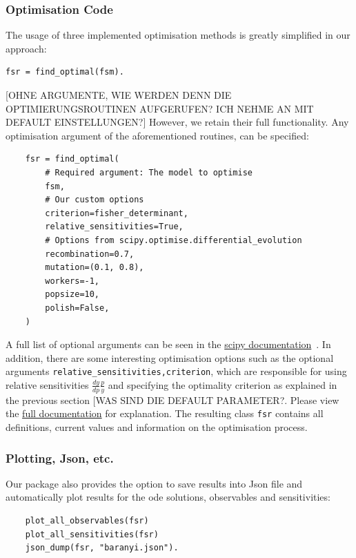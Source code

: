 \documentclass[10pt,A4paper]{article}
\begin{document}
\subsubsection*{Optimisation Code}
The usage of three implemented optimisation methods is greatly simplified in our approach: 
\begin{verbatim}
fsr = find_optimal(fsm).
\end{verbatim}
[OHNE ARGUMENTE, WIE WERDEN DENN DIE OPTIMIERUNGSROUTINEN AUFGERUFEN? ICH NEHME AN MIT DEFAULT EINSTELLUNGEN?]
However, we retain their full functionality. Any optimisation argument of the aforementioned routines, can be specified: 
\begin{verbatim}
    fsr = find_optimal(
        # Required argument: The model to optimise
        fsm,
        # Our custom options
        criterion=fisher_determinant,
        relative_sensitivities=True,
        # Options from scipy.optimise.differential_evolution
        recombination=0.7,
        mutation=(0.1, 0.8),
        workers=-1,
        popsize=10,
        polish=False,
    )
\end{verbatim}
A full list of optional arguments can be seen in the \href{https://docs.scipy.org/doc/scipy/reference/optimize.html#global-optimization}{scipy documentation}~\cite{virtanenSciPyFundamentalAlgorithms2020}. 
In addition, there are some interesting optimisation options such as the optional arguments \texttt{relative_sensitivities,criterion}, which are responsible for using relative sensitivities $\tfrac{dy}{dp}\tfrac{p}{y}$ and specifying the optimality criterion as explained in the previous section [WAS SIND DIE DEFAULT PARAMETER?. 
Please view the \href{https://spatial-systems-biology-freiburg.github.io/FisInMa/}{full documentation} for explanation.
The resulting class \texttt{fsr} contains all definitions, current values and information on the optimisation process.
%
\subsubsection*{Plotting, Json, etc.}
Our package also provides the option to save results into Json file and automatically plot results for the ode solutions, observables and sensitivities:
\begin{verbatim}
    plot_all_observables(fsr)
    plot_all_sensitivities(fsr)
    json_dump(fsr, "baranyi.json").
\end{verbatim}
%
%
%
\end{document}
